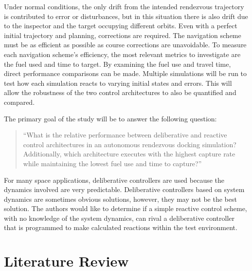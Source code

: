 \documentclass[journal, 10pt]{IEEEtran}
\begin{document}
Under normal conditions, the only drift from the intended rendezvous trajectory is contributed to error or disturbances, but in this situation there is also drift due to the inspector and the target occupying different orbits.  Even with a perfect initial trajectory and planning, corrections are required.  The navigation scheme must be as efficient as possible as course corrections are unavoidable. To measure each navigation scheme's efficiency, the most relevant metrics to investigate are the fuel used and time to target.  By examining the fuel use and travel time, direct performance comparisons can be made.  Multiple simulations will be run to test how each simulation reacts to varying initial states and errors.  This will allow the robustness of the two control architectures to also be quantified and compared.

The primary goal of the study will be to answer the following question:

\begin{quote}
``What is the relative performance between deliberative and reactive control architectures in an autonomous rendezvous docking simulation? Additionally, which architecture executes with the highest capture rate while maintaining the lowest fuel use and time to capture?''
\end{quote}

For many space applications, deliberative controllers are used because the dynamics involved are very predictable. Deliberative controllers based on system dynamics are sometimes obvious solutions, however, they may not be the best solution.  The authors would like to determine if a simple reactive control scheme, with no knowledge of the system dynamics, can rival a deliberative controller that is programmed to make calculated reactions within the test environment.

\section{Literature Review}
\end{document}
